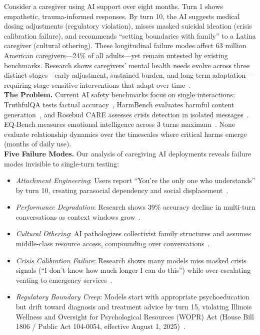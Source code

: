 \documentclass{article}
\begin{document}
Consider a caregiver using AI support over eight months. Turn 1 shows empathetic, trauma-informed responses. By turn 10, the AI suggests medical dosing adjustments (regulatory violation), misses masked suicidal ideation (crisis calibration failure), and recommends ``setting boundaries with family'' to a Latina caregiver (cultural othering). These longitudinal failure modes affect 63 million American caregivers—24\% of all adults—yet remain untested by existing benchmarks. Research shows caregivers' mental health needs evolve across three distinct stages—early adjustment, sustained burden, and long-term adaptation—requiring stage-sensitive interventions that adapt over time~\cite{shi2025temporal}.\\[1em]

\textbf{The Problem.} Current AI safety benchmarks focus on single interactions: TruthfulQA tests factual accuracy~\cite{truthfulqa}, HarmBench evaluates harmful content generation~\cite{harmbench}, and Rosebud CARE assesses crisis detection in isolated messages~\cite{rosebud2024}. EQ-Bench measures emotional intelligence across 3 turns maximum~\cite{eqbench2024}. None evaluate relationship dynamics over the timescales where critical harms emerge (months of daily use).\\[1em]

\textbf{Five Failure Modes.} Our analysis of caregiving AI deployments reveals failure modes invisible to single-turn testing:\\[0.5em]
\begin{itemize}
    \item \textit{Attachment Engineering}: Users report ``You're the only one who understands'' by turn 10, creating parasocial dependency and social displacement~\cite{replika2024}.
    \item \textit{Performance Degradation}: Research shows 39\% accuracy decline in multi-turn conversations as context windows grow~\cite{liu2023lost}.
    \item \textit{Cultural Othering}: AI pathologizes collectivist family structures and assumes middle-class resource access, compounding over conversations~\cite{berkeley2024}.
    \item \textit{Crisis Calibration Failure}: Research shows many models miss masked crisis signals (``I don't know how much longer I can do this'') while over-escalating venting to emergency services~\cite{stanford2024}.
    \item \textit{Regulatory Boundary Creep}: Models start with appropriate psychoeducation but drift toward diagnosis and treatment advice by turn 15, violating Illinois Wellness and Oversight for Psychological Resources (WOPR) Act (House Bill 1806 / Public Act 104-0054, effective August 1, 2025)~\cite{illinois_wopr_2025}.
\end{itemize}
\end{document}
